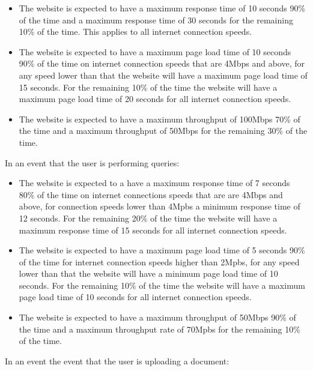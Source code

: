 \documentclass[a4paper, 12pt]{article}
\begin{document}
\begin{itemize}
\item The website is expected to have a maximum response time of 10 seconds 90\% of the time and a maximum response time of 30 seconds for the remaining 10\% of the time. This applies to all internet connection speeds.
\item The website is expected to have a maximum page load time of 10 seconds 90\% of the time on internet connection speeds that are 4Mbps and above, for any speed lower than that the website will have a maximum page load time of 15 seconds. For the remaining 10\% of the time the website will have a maximum page load time of 20 seconds for all internet connection speeds.
\item The website is expected to have a maximum throughput of 100Mbps 70\% of the time and a maximum throughput of 50Mbps for the remaining 30\% of the time.
\end{itemize}

In an event that the user is performing queries:

\begin{itemize}
\item The website is expected to a have a maximum response time of 7 seconds 80\% of the time on internet connections speeds that are are 4Mbps and above, for connection speeds lower than 4Mpbs a minimum response time of 12 seconds. For the remaining 20\% of the time the website will have a maximum response time of 15 seconds for all internet connection speeds.
\item The website is expected to have a maximum page load time of 5 seconds 90\% of the time for internet connection speeds higher than 2Mpbs, for any speed lower than that the website will have a minimum page load time of 10 seconds. For the remaining 10\% of the time the website will have a maximum page load time of 10 seconds for all internet connection speeds.
\item The website is expected to have a maximum throughput of 50Mbps 90\% of the time and a maximum throughput rate of 70Mpbs for the remaining 10\% of the time.
\end{itemize}

In an event the event that the user is uploading a document:
\end{document}
